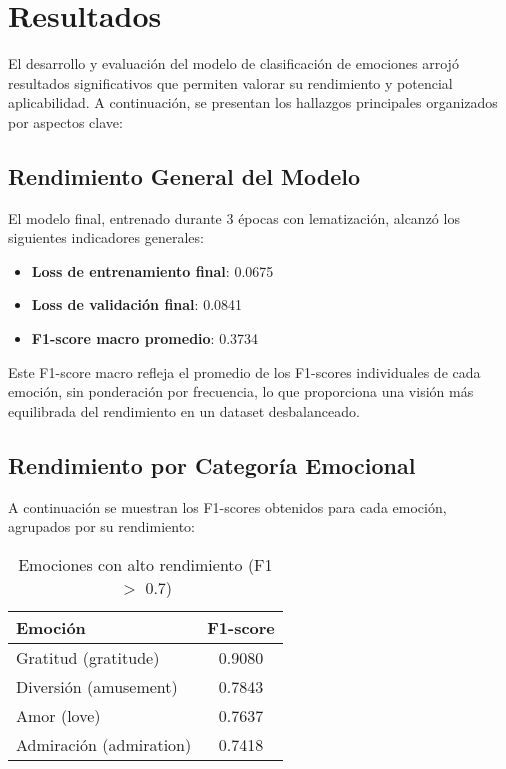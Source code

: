 \documentclass[12pt,a4paper]{report}
\begin{document}
\section{Resultados}

El desarrollo y evaluación del modelo de clasificación de emociones arrojó resultados significativos que permiten valorar su rendimiento y potencial aplicabilidad. A continuación, se presentan los hallazgos principales organizados por aspectos clave:

\subsection{Rendimiento General del Modelo}

El modelo final, entrenado durante 3 épocas con lematización, alcanzó los siguientes indicadores generales:
\begin{itemize}
  \item \textbf{Loss de entrenamiento final}: 0.0675
  \item \textbf{Loss de validación final}: 0.0841
  \item \textbf{F1-score macro promedio}: 0.3734
\end{itemize}

Este F1-score macro refleja el promedio de los F1-scores individuales de cada emoción, sin ponderación por frecuencia, lo que proporciona una visión más equilibrada del rendimiento en un dataset desbalanceado.

\subsection{Rendimiento por Categoría Emocional}

A continuación se muestran los F1-scores obtenidos para cada emoción, agrupados por su rendimiento:

\begin{table}[htbp]
  \centering
  \caption{Emociones con alto rendimiento (F1 $>$ 0.7)}
  \begin{tabular}{lc}
    \toprule
    \textbf{Emoción} & \textbf{F1-score} \\
    \midrule
    Gratitud (gratitude) & 0.9080 \\
    Diversión (amusement) & 0.7843 \\
    Amor (love) & 0.7637 \\
    Admiración (admiration) & 0.7418 \\
    \bottomrule
  \end{tabular}
\end{table}
\end{document}
